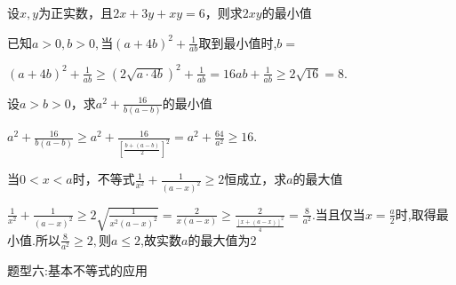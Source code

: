 \par
\begin{problem}
    设$x,y$为正实数，且$2x+3y+xy=6$，则求$2xy$的最小值
\end{problem}

\par
\begin{problem}
    已知$a>0,b>0,$当$\displaystyle (a+4b)^2+\frac{1}{ab}$取到最小值时,$b=$
    \begin{jiexi}
        $\displaystyle (a+4b)^2+\frac{1}{ab}\ge(2\sqrt{a\cdot4b})^2+\frac{1}{ab}=16ab+\frac{1}{ab}\ge 2\sqrt{16}=8$.
    \end{jiexi}
\end{problem}

\par
\begin{problem}
    设$a>b>0$，求$\displaystyle a^2+\frac{16}{b(a-b)}$的最小值
    \begin{jiexi}
        $\displaystyle a^2+\frac{16}{b(a-b)}\ge a^2+\frac{16}{[\frac{b+(a-b)}{2}]^2}=a^2+\frac{64}{a^2}\ge16$.
    \end{jiexi}
\end{problem}

\par
\begin{problem}
    当$0<x<a$时，不等式$\displaystyle \frac{1}{x^2}+\frac{1}{(a-x)^2}\ge2$恒成立，求$a$的最大值
    \begin{jiexi}
        $\displaystyle \frac{1}{x^2}+\frac{1}{(a-x)^2}\ge 2\sqrt{\frac{1}{x^2(a-x)^2}}=\frac{2}{x(a-x)}\ge \frac{2}{\frac{[x+(a-x)]^2}{4}}=\frac{8}{a^2}$.当且仅当$x=\frac{a}{2}$时,取得最小值.所以$\displaystyle \frac{8}{a^2}\ge2,\text{则}a\le2$,故实数$a$的最大值为2
    \end{jiexi}
\end{problem}




\begin{tcolorbox} 
    \centering
    题型六:基本不等式的应用
\end{tcolorbox}

